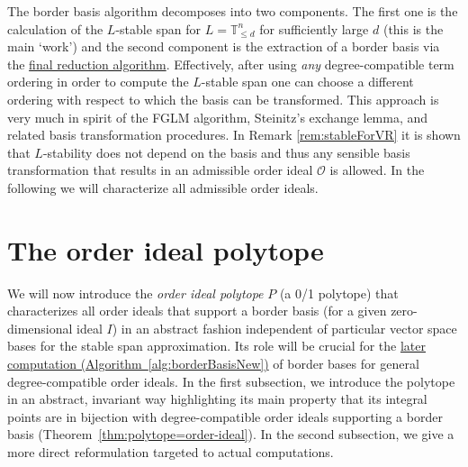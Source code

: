 \documentclass[11pt,oneside,english]{amsart}
\makeatletter
\numberwithin{equation}{section}
\numberwithin{figure}{section}
\theoremstyle{plain}
\theoremstyle{definition}
\theoremstyle{definition}
\theoremstyle{remark}
\theoremstyle{plain}
\theoremstyle{plain}
\theoremstyle{plain}
\theoremstyle{problem@}
\makeatother
\begin{document}
The border basis algorithm decomposes
into two components. The first one is the calculation of the $L$-stable
span for $L={\mathbb{T}}_{\leq d}^{n}$ for sufficiently large $d$ (this is the main `work')
and the second component is the extraction of a border basis
via the \hyperref[alg:finalReduction]{final reduction algorithm}.
Effectively,
after using \emph{any} degree-compatible term ordering in order to
compute the $L$-stable span one can choose a different ordering with
respect to which the basis can be transformed. This approach is very
much in spirit of the FGLM algorithm, Steinitz's exchange lemma, and
related basis transformation procedures. In Remark \ref{rem:stableForVR}
it is shown that $L$-stability does not depend on the basis and thus
any sensible basis transformation that results in an admissible order
ideal ${\mathcal{O}}$ is allowed. In the following we will characterize all
admissible order ideals.

\section{\label{sec:The-order-ideal}The order ideal polytope}

We will now introduce the \emph{order ideal polytope} $P$ (a 0/1 polytope)  
that characterizes all order ideals that
support a border basis (for a given zero-dimensional ideal $I$) in an abstract fashion independent of particular vector space bases for the stable span approximation. Its role will be crucial for the \hyperref[alg:borderBasisNew]{later computation
  (Algorithm~\ref*{alg:borderBasisNew})} of
border bases for general degree-compatible
order ideals.
In the first subsection,
we introduce the polytope in an abstract, invariant way
highlighting its main property that
its integral points are in bijection with degree-compatible order ideals
supporting a border basis
(Theorem~\ref{thm:polytope=order-ideal}).
In the second subsection,
we give a more direct reformulation targeted to actual computations.
\end{document}
